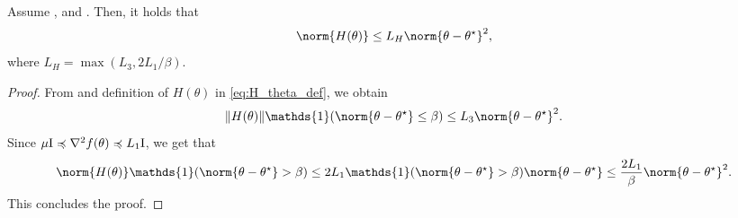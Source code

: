 \begin{lemma}
\label{lem:H_theta_bound}
    Assume , and . Then, it holds that
    \begin{equation}
        \norm{H(\theta)}\leq L_{H} \norm{\theta-\thetas}^2,
    \end{equation}
    where $L_{H}= \max(L_3,2L_1/\beta)$.
\end{lemma}
\begin{proof}
    From  and definition of $H(\theta)$ in \eqref{eq:H_theta_def}, we obtain 
    \begin{equation}
        \| H(\theta) \| \mathds{1}(\norm{\theta-\thetas}\leq \beta)\leq L_3\norm{\theta-\thetas}^2.
    \end{equation}
   Since  $\mu \mathrm{I} \preccurlyeq \nabla^2f(\theta) \preccurlyeq L_1 \mathrm{I}$, we get that  
    \begin{equation}
        \norm{H(\theta)} \mathds{1}(\norm{\theta-\thetas} > \beta) \leq 2L_1\mathds{1}(\norm{\theta-\thetas} > \beta)\norm{\theta-\thetas} \leq \frac{2L_1}{\beta}\norm{\theta-\thetas}^2.
    \end{equation}
This concludes the proof.
\end{proof}